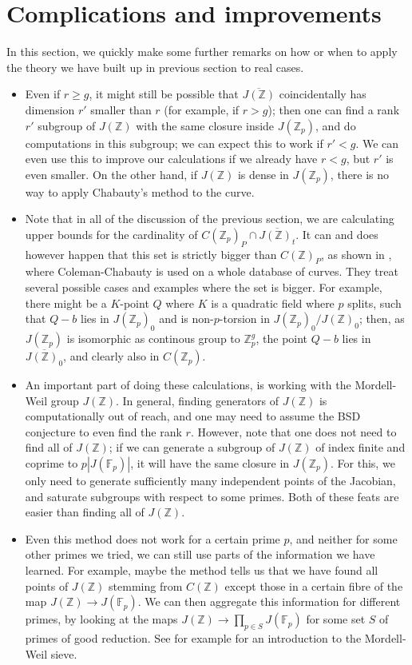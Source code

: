 \documentclass[12pt]{article}
\newcommand{\Z}{\mathbb{Z}}
\newcommand{\F}{\mathbb{F}}
\theoremstyle{plain}
\theoremstyle{definition}
\theoremstyle{remark}
\begin{document}
\section{Complications and improvements}
\label{section:remarks} 
In this section, we quickly make some further remarks on how or when to apply the theory we have built up in previous section to real cases.
\begin{itemize} 
\item Even if $r \geq g$, it might still be possible that $\overline{J(\Z)}$ coincidentally has dimension $r'$ smaller than $r$ (for example, if $r > g$); then one can find a rank $r'$ subgroup of $J(\Z)$ with the same closure inside $J(\Z_p)$, and do computations in this subgroup; we can expect this to work if $r' < g$. We can even use this to improve our calculations if we already have $r < g$, but $r'$ is even smaller. On the other hand, if $J(\Z)$ is dense in $J(\Z_p)$, there is no way to apply Chabauty's method to the curve.
\item Note that in all of the discussion of the previous section, we are calculating upper bounds for the cardinality of $C(\Z_p)_P \cap \overline{J(\Z)_t}$. It can and does however happen that this set is strictly bigger than $C(\Z)_P$, as shown in \cite{Balakrishnan19}, where Coleman-Chabauty is used on a whole database of curves. They treat several possible cases and examples where the set is bigger. For example, there might be a $K$-point $Q$ where $K$ is a quadratic field where $p$ splits, such that $Q-b$ lies in $J(\Z_p)_0$ and is non-$p$-torsion in $J(\Z_p)_0/J(\Z)_0$; then, as $J(\Z_p)$ is isomorphic as continous group to $\Z_p^g$, the point $Q-b$ lies in $\overline{J(\Z)_0}$, and clearly also in $C(\Z_p)$.
\item An important part of doing these calculations, is working with the Mordell-Weil group $J(\Z)$. In general, finding generators of $J(\Z)$ is computationally out of reach, and one may need to assume the BSD conjecture to even find the rank $r$. However, note that one does not need to find all of $J(\Z)$; if we can generate a subgroup of $J(\Z)$ of index finite and coprime to $p|J(\F_p)|$, it will have the same closure in $J(\Z_p)$. For this, we only need to generate sufficiently many independent points of the Jacobian, and saturate subgroups with respect to some primes. Both of these feats are easier than finding all of $J(\Z)$.
\item Even this method does not work for a certain prime $p$, and neither for some other primes we tried, we can still use parts of the information we have learned. For example, maybe the method tells us that we have found all points of $J(\Z)$ stemming from $C(\Z)$ except those in a certain fibre of the map $J(\Z) \to J(\F_p)$. We can then aggregate this information for different primes, by looking at the maps $J(\Z) \to \prod_{p \in S} J(\F_p)$ for some set $S$ of primes of good reduction. See for example \cite{stoll10} for an introduction to the Mordell-Weil sieve.
\end{itemize}
\end{document}
